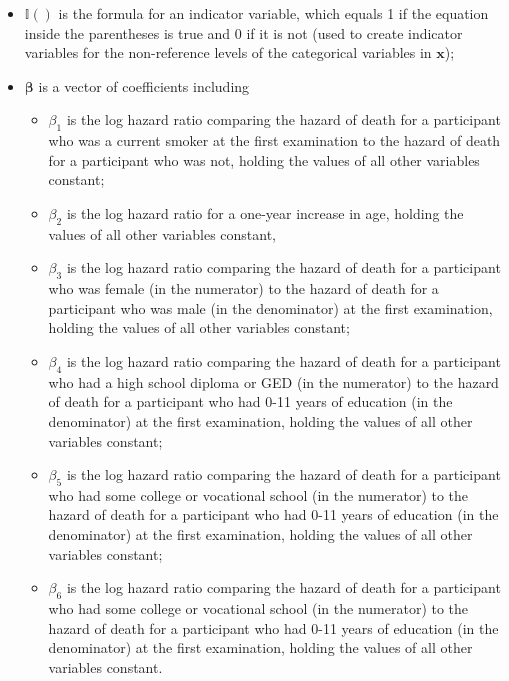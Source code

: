 \documentclass{article}\usepackage[]{graphicx}\usepackage[]{color}
\begin{document}
\begin{itemize}
\begin{itemize}
\begin{itemize}
      \end{itemize}
    \end{itemize}
  \item $\mathbb{I}()$ is the formula for an indicator variable, which equals 1 if the equation inside the parentheses is true and 0 if it is not (used to create indicator variables for the non-reference levels of the categorical variables in $\mathbf{x}$);  
  \item $\bm{\beta}$ is a vector of coefficients including
    \begin{itemize}
      \item $\beta_1$ is the log hazard ratio comparing the hazard of death for a participant who was a current smoker at the first examination to the hazard of death for a participant who was not, holding the values of all other variables constant;
      \item $\beta_2$ is the log hazard ratio for a one-year increase in age, holding the values of all other variables constant,
      \item $\beta_3$ is the log hazard ratio comparing the hazard of death for a participant who was female (in the numerator) to the hazard of death for a participant who was male (in the denominator) at the first examination, holding the values of all other variables constant;
      \item $\beta_4$ is the log hazard ratio comparing the hazard of death for a participant who had a high school diploma or GED (in the numerator) to the hazard of death for a participant who had 0-11 years of education (in the denominator) at the first examination, holding the values of all other variables constant;
      \item $\beta_5$ is the log hazard ratio comparing the hazard of death for a participant who had some college or vocational school (in the numerator) to the hazard of death for a participant who had 0-11 years of education (in the denominator) at the first examination, holding the values of all other variables constant;
      \item $\beta_6$ is the log hazard ratio comparing the hazard of death for a participant who had some college or vocational school (in the numerator) to the hazard of death for a participant who had 0-11 years of education (in the denominator) at the first examination, holding the values of all other variables constant.
    \end{itemize}
  \end{itemize}
      
\end{document}

